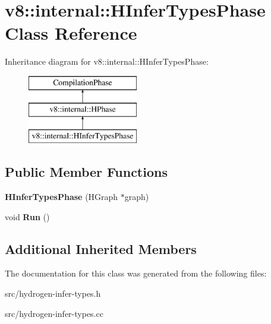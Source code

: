 \hypertarget{classv8_1_1internal_1_1_h_infer_types_phase}{}\section{v8\+:\+:internal\+:\+:H\+Infer\+Types\+Phase Class Reference}
\label{classv8_1_1internal_1_1_h_infer_types_phase}
Inheritance diagram for v8\+:\+:internal\+:\+:H\+Infer\+Types\+Phase\+:\begin{figure}[H]
\begin{center}
\leavevmode
\includegraphics[height=3.000000cm]{classv8_1_1internal_1_1_h_infer_types_phase}
\end{center}
\end{figure}
\subsection*{Public Member Functions}
\begin{DoxyCompactItemize}
\item 
\hypertarget{classv8_1_1internal_1_1_h_infer_types_phase_aadd04d9c662b405789fd72d40baaeef0}{}{\bfseries H\+Infer\+Types\+Phase} (H\+Graph $\ast$graph)\label{classv8_1_1internal_1_1_h_infer_types_phase_aadd04d9c662b405789fd72d40baaeef0}

\item 
\hypertarget{classv8_1_1internal_1_1_h_infer_types_phase_a0cc612b8e99ba3c1afbb220c660e94a0}{}void {\bfseries Run} ()\label{classv8_1_1internal_1_1_h_infer_types_phase_a0cc612b8e99ba3c1afbb220c660e94a0}

\end{DoxyCompactItemize}
\subsection*{Additional Inherited Members}


The documentation for this class was generated from the following files\+:\begin{DoxyCompactItemize}
\item 
src/hydrogen-\/infer-\/types.\+h\item 
src/hydrogen-\/infer-\/types.\+cc\end{DoxyCompactItemize}
